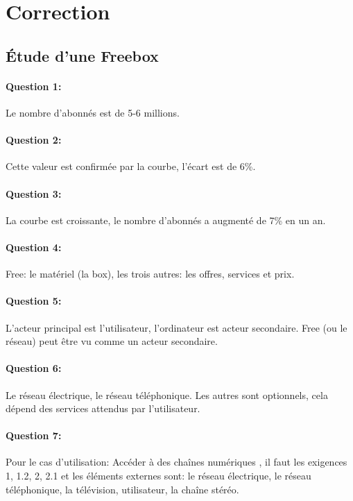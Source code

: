 \clearpage

\ifdef{\public}{}{}

\newpage

\pagestyle{correction}

\section{Correction}

\subsection{Étude d'une Freebox}

\paragraph{Question 1:} Le nombre d'abonnés est de 5-6 millions.

\paragraph{Question 2:} Cette valeur est confirmée par la courbe, l'écart est de 6\%.

\paragraph{Question 3:} La courbe est croissante, le nombre d'abonnés a augmenté de 7\% en un an.

\paragraph{Question 4:} Free: le matériel (la box), les trois autres: les offres, services et prix.

\paragraph{Question 5:} L'acteur principal est l'utilisateur, l'ordinateur est acteur secondaire. Free (ou le réseau) peut être vu comme un acteur secondaire.

\paragraph{Question 6:} Le réseau électrique, le réseau téléphonique. Les autres sont optionnels, cela dépend des services attendus par l'utilisateur.

\paragraph{Question 7:} Pour le cas d'utilisation: \og Accéder à des chaînes numériques \fg, il faut les exigences 1, 1.2, 2, 2.1 et les éléments externes sont: le réseau électrique, le réseau téléphonique, la télévision, utilisateur, la chaîne stéréo.

